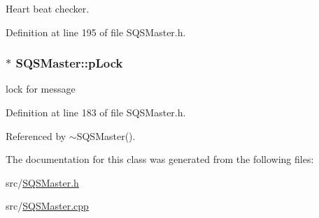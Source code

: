 \-Heart beat checker. 



\-Definition at line 195 of file \-S\-Q\-S\-Master.\-h.

\hypertarget{classSQSMaster_a22ea7350f17c94861eb488ae5f4f7abb}{
\subsubsection[{p\-Lock}]{$\ast$ {\bf \-S\-Q\-S\-Master\-::p\-Lock}}}\label{dc/d1b/classSQSMaster_a22ea7350f17c94861eb488ae5f4f7abb}


lock for message 



\-Definition at line 183 of file \-S\-Q\-S\-Master.\-h.



\-Referenced by $\sim$\-S\-Q\-S\-Master().



\-The documentation for this class was generated from the following files\-:\begin{DoxyCompactItemize}
\item 
src/\hyperlink{SQSMaster_8h}{\-S\-Q\-S\-Master.\-h}\item 
src/\hyperlink{SQSMaster_8cpp}{\-S\-Q\-S\-Master.\-cpp}\end{DoxyCompactItemize}

